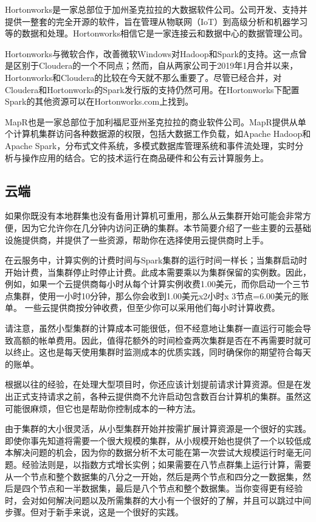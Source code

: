 \documentclass[
]{article}
\begin{document}
Hortonworks是一家总部位于加州圣克拉拉的大数据软件公司。公司开发、支持并提供一整套的完全开源的软件，旨在管理从物联网（IoT）到高级分析和机器学习等的数据和处理。Hortonworks相信它是一家连接云和数据中心的数据管理公司。

Hortonworks与微软合作，改善微软Windows对Hadoop和Spark的支持。这一点曾是区别于Cloudera的一个不同点；然而，自从两家公司于2019年1月合并以来，Hortonworks和Cloudera的比较在今天就不那么重要了。尽管已经合并，对Cloudera和Hortonworks的Spark发行版的支持仍然可用。在Hortonworks下配置Spark的其他资源可以在Hortonworks.com上找到。

MapR也是一家总部位于加利福尼亚州圣克拉拉的商业软件公司。MapR提供从单个计算机集群访问各种数据源的权限，包括大数据工作负载，如Apache
Hadoop和Apache
Spark，分布式文件系统，多模式数据库管理系统和事件流处理，实时分析与操作应用的结合。它的技术运行在商品硬件和公有云计算服务上。

\hypertarget{ux4e91ux7aef}{%
\subsection{云端}\label{ux4e91ux7aef}}

如果你既没有本地群集也没有备用计算机可重用，那么从云集群开始可能会非常方便，因为它允许你在几分钟内访问正确的集群。本节简要介绍了一些主要的云基础设施提供商，并提供了一些资源，帮助你在选择使用云提供商时上手。

在云服务中，计算实例的计费时间与Spark集群的运行时间一样长；当集群启动时开始计费，当集群停止时停止计费。此成本需要乘以为集群保留的实例数。因此，例如，如果一个云提供商每小时从每个计算实例收费1.00美元，而你启动一个三节点集群，使用一小时10分钟，那么你会收到1.00美元x2小时x
3节点=6.00美元的账单。
一些云提供商按分钟收费，但至少你可以采用他们每小时计算收费。

请注意，虽然小型集群的计算成本可能很低，但不经意地让集群一直运行可能会导致高额的帐单费用。因此，值得花额外的时间检查两次集群是否在不再需要时就可以终止。这也是每天使用集群时监测成本的优质实践，同时确保你的期望符合每天的账单。

根据以往的经验，在处理大型项目时，你还应该计划提前请求计算资源。但是在发出正式支持请求之前，各种云提供商不允许启动包含数百台计算机的集群。虽然这可能很麻烦，但它也是帮助你控制成本的一种方法。

由于集群的大小很灵活，从小型集群开始并按需扩展计算资源是一个很好的实践。即使你事先知道将需要一个很大规模的集群，从小规模开始也提供了一个以较低成本解决问题的机会，因为你的数据分析不太可能在第一次尝试大规模运行时毫无问题。经验法则是，以指数方式增长实例；如果需要在八节点群集上运行计算，需要从一个节点和整个数据集的八分之一开始，然后是两个节点和四分之一数据集，然后是四个节点和一半数据集，最后是八个节点和整个数据集。当你变得更有经验时，会对如何解决问题以及所需集群的大小有一个很好的了解，并且可以跳过中间步骤。但对于新手来说，这是一个很好的实践。
\end{document}
